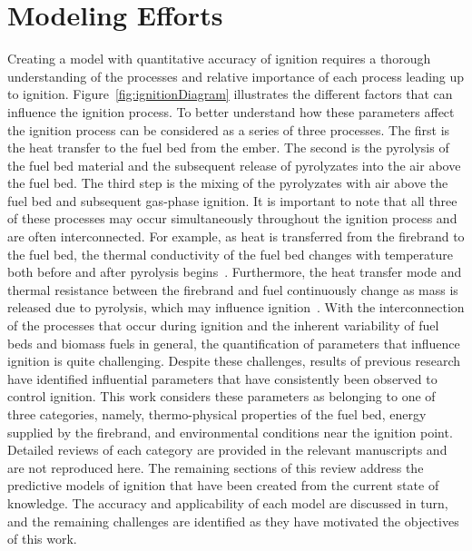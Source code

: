 \section{Modeling Efforts}
    Creating a model with quantitative accuracy of ignition requires a thorough understanding of the processes and relative importance of each process leading up to ignition. Figure~\ref{fig:ignitionDiagram} illustrates the different factors that can influence the ignition process. To better understand how these parameters affect the ignition process can be considered as a series of three processes. The first is the heat transfer to the fuel bed from the ember. The second is the pyrolysis of the fuel bed material and the subsequent release of pyrolyzates into the air above the fuel bed. The third step is the mixing of the pyrolyzates with air above the fuel bed and subsequent gas-phase ignition. It is important to note that all three of these processes may occur simultaneously throughout the ignition process and are often interconnected. For example, as heat is transferred from the firebrand to the fuel bed, the thermal conductivity of the fuel bed changes with temperature both before and after pyrolysis begins~\cite{Fjellerup2003}. Furthermore, the heat transfer mode and thermal resistance between the firebrand and fuel continuously change as mass is released due to pyrolysis, which may influence ignition~\cite{Yang2016EffectParticle}. With the interconnection of the processes that occur during ignition and the inherent variability of fuel beds and biomass fuels in general, the quantification of parameters that influence ignition is quite challenging. Despite these challenges, results of previous research have identified influential parameters that have consistently been observed to control ignition. This work considers these parameters as belonging to one of three categories, namely, thermo-physical properties of the fuel bed, energy supplied by the firebrand, and environmental conditions near the ignition point. Detailed reviews of each category are provided in the relevant manuscripts and are not reproduced here. The remaining sections of this review address the predictive models of ignition that have been created from the current state of knowledge. The accuracy and applicability of each model are discussed in turn, and the remaining challenges are identified as they have motivated the objectives of this work. 
